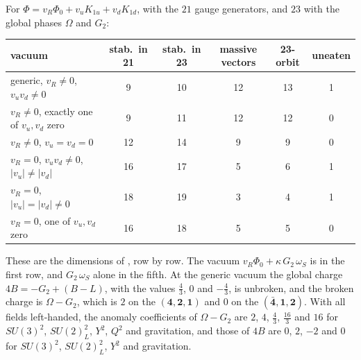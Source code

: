 \begin{theorem}
\label{thm:uneaten}
For $\Phi=v_R\Phi_0+v_uK_{1u}+v_dK_{1d}$, with the $21$ gauge generators, and $23$ with the global phases $\Omega$ and $G_2$:
\begin{center}
\small\setlength{\tabcolsep}{5pt}
\begin{tabular}{@{}lccccc@{}}
\toprule
vacuum & stab.\ in 21 & stab.\ in 23 & massive vectors & 23-orbit & uneaten\\
\midrule
generic, $v_R\ne0$, $v_uv_d\ne0$ & 9 & 10 & 12 & 13 & 1\\
$v_R\ne0$, exactly one of $v_u,v_d$ zero & 9 & 11 & 12 & 12 & 0\\
$v_R\ne0$, $v_u=v_d=0$ & 12 & 14 & 9 & 9 & 0\\
$v_R=0$, $v_uv_d\ne0$, $|v_u|\ne|v_d|$ & 16 & 17 & 5 & 6 & 1\\
$v_R=0$, $|v_u|=|v_d|\ne0$ & 18 & 19 & 3 & 4 & 1\\
$v_R=0$, one of $v_u,v_d$ zero & 16 & 18 & 5 & 5 & 0\\
\bottomrule
\end{tabular}
\end{center}
These are the dimensions of , row by row. The vacuum $v_R\Phi_0+\kappa\,G_2\,\omega_S$ is in the first row, and $G_2\,\omega_S$
alone in the fifth. At the generic vacuum the global charge $4B=-G_2+(B\!-\!L)$, with the values $\tfrac43$, $0$ and $-\tfrac43$, is unbroken,
and the broken charge is $\Omega-G_2$, which is $2$ on the $(\mathbf4,\mathbf2,\mathbf1)$ and $0$ on the $(\bar{\mathbf4},\mathbf1,\mathbf2)$.
With all fields left-handed, the anomaly coefficients of $\Omega-G_2$ are $2$, $4$, $\tfrac43$, $\tfrac{16}3$ and $16$ for $SU(3)^2$,
$SU(2)_L^2$, $Y^2$, $Q^2$ and gravitation, and those of $4B$ are $0$, $2$, $-2$ and $0$ for $SU(3)^2$, $SU(2)_L^2$, $Y^2$ and gravitation.
\end{theorem}

